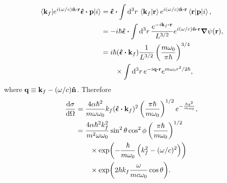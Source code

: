 \documentclass[
a4paper,
10pt,
twoside,
]{article}
\begin{document}
\begin{align}
	\mel*{\vb{k}_f}{e^{i(\omega/c)\vu{n}\vdot\vb{r}}\bm{\hat{\epsilon}}\vdot\vb{p}}{i}
	&= \bm{\hat{\epsilon}} \vdot \int \dd[3]{r} \ip*{\vb{k}_f}{\vb{r}} e^{i(\omega/c)\vu{n}\vdot\vb{r}} \mel*{\vb{r}}{\vb{p}}{i},\\
	&= -i\hbar\bm{\hat{\epsilon}} \vdot \int \dd[3]{r} \frac{e^{-i\vb{k}_f\vdot\vb{r}}}{L^{3/2}}e^{i(\omega/c)\vu{n}\vdot\vb{r}} \grad{\psi(\vb{r})},\\
	&= i\hbar(\bm{\hat{\epsilon}}\vdot\vb{k}_f)\frac{1}{L^{3/2}}\left(\frac{m\omega_0}{\pi\hbar}\right)^{3/4}\nonumber\\
	&\qquad\times \int \dd[3]{r} e^{-i \vb{q}\vdot\vb{r}}e^{m\omega_0 r^2/2\hbar},
\end{align}
where $\vb{q} \equiv \vb{k}_f - (\omega/c) \vu{n}$.
Therefore
\begin{align}
	\dv{\sigma}{\Omega}
	&= \frac{4\alpha\hbar^2}{m\omega\omega_0} k_f (\bm{\hat{\epsilon}}\vdot\vb{k}_f)^2 \left(\frac{\pi\hbar}{m\omega_0}\right)^{1/2} e^{-\frac{\hbar q^2}{m\omega_0}},\\
	&= \frac{4\alpha\hbar^2k_f^2}{m^2\omega\omega_0}\sin^2\theta\cos^2\phi\left(\frac{\pi\hbar}{m\omega_0}\right)^{1/2}\nonumber\\
	&\qquad\times \exp(-\frac{\hbar}{m\omega_0} \left(k_f^2-(\omega/c)^2\right))\nonumber\\
	&\qquad\times \exp(2\hbar k_f \frac{\omega}{mc\omega_0}\cos\theta).
\end{align}


\stopmcols
\end{document}
